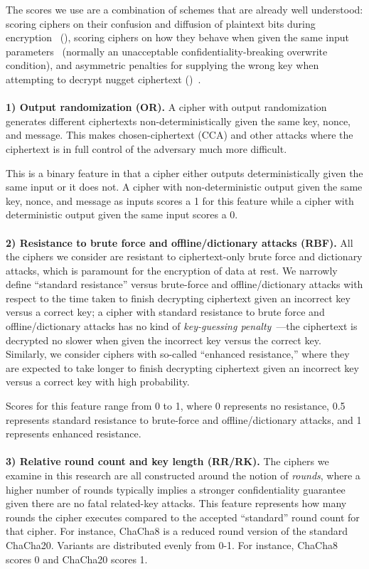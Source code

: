 The scores we use are a combination of schemes that are already well understood:
scoring ciphers on their confusion and diffusion of plaintext bits during
encryption~\cite{MicrosoftCryptanalysisAES,SchneiersOnRounds} (), scoring ciphers on how they behave when given the same input
parameters~\cite{random-output1,Freestyle,random-output2} (normally an
unacceptable confidentiality-breaking overwrite condition), and asymmetric
penalties for supplying the wrong key when attempting to decrypt nugget
ciphertext ()~\cite{scrypt,Freestyle,others2}.\\
\\
\textbf{1) Output randomization (OR).} A cipher with output randomization
generates different ciphertexts non-deterministically given the same key, nonce,
and message. This makes chosen-ciphertext (CCA) and other attacks where the
ciphertext is in full control of the adversary much more difficult.

This is a binary feature in that a cipher either outputs deterministically given
the same input or it does not. A cipher with non-deterministic output given the
same key, nonce, and message as inputs scores a 1 for this feature while a
cipher with deterministic output given the same input scores a 0.\\
\\
\textbf{2) Resistance to brute force and offline/dictionary attacks (RBF).}
All the ciphers we consider are resistant to ciphertext-only brute force and
dictionary attacks, which is paramount for the encryption of data at rest. We
narrowly define ``standard resistance'' versus brute-force and
offline/dictionary attacks with respect to the time taken to finish decrypting
ciphertext given an incorrect key versus a correct key; a cipher with standard
resistance to brute force and offline/dictionary attacks has no kind of
\emph{key-guessing penalty}~\cite{Freestyle}---the ciphertext is decrypted no
slower when given the incorrect key versus the correct key. Similarly, we
consider ciphers with so-called ``enhanced resistance,'' where they are expected
to take longer to finish decrypting ciphertext given an incorrect key versus a
correct key with high probability.

Scores for this feature range from 0 to 1, where 0 represents no resistance, 0.5
represents standard resistance to brute-force and offline/dictionary attacks,
and 1 represents enhanced resistance.\\
\\
\textbf{3) Relative round count and key length (RR/RK).} The ciphers we examine
in this research are all constructed around the notion of \emph{rounds}, where a
higher number of rounds typically implies a stronger confidentiality guarantee
given there are no fatal related-key attacks. This feature represents how many
rounds the cipher executes compared to the accepted ``standard'' round count for
that cipher. For instance, ChaCha8 is a reduced round version of the standard
ChaCha20. Variants are distributed evenly from 0-1. For instance, ChaCha8 scores
0 and ChaCha20 scores 1\@.

